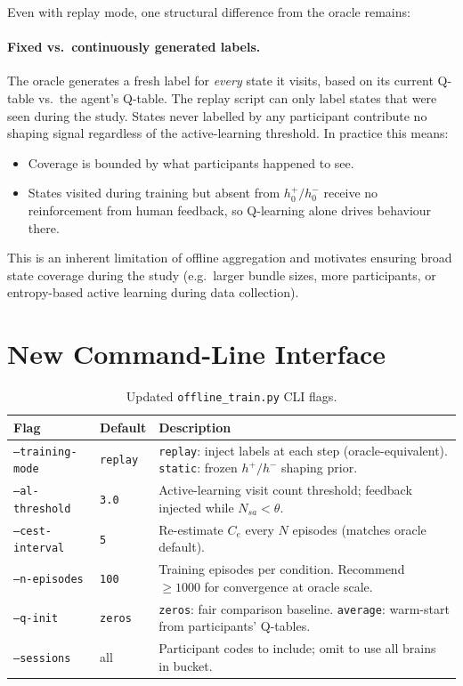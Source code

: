 \documentclass[11pt, a4paper]{article}
\begin{document}
Even with replay mode, one structural difference from the oracle remains:

\paragraph{Fixed vs.\ continuously generated labels.}
The oracle generates a fresh label for \emph{every} state it visits, based on
its current Q-table vs.\ the agent's Q-table.  The replay script can only
label states that were seen during the study.  States never labelled by any
participant contribute no shaping signal regardless of the active-learning
threshold.  In practice this means:
\begin{itemize}
  \item Coverage is bounded by what participants happened to see.
  \item States visited during training but absent from $h^+_0/h^-_0$ receive
        no reinforcement from human feedback, so Q-learning alone drives
        behaviour there.
\end{itemize}
This is an inherent limitation of offline aggregation and motivates ensuring
broad state coverage during the study (e.g.\ larger bundle sizes, more
participants, or entropy-based active learning during data collection).

\section{New Command-Line Interface}
\label{sec:cli}

\begin{table}[h!]
\centering
\begin{tabular}{llp{7.5cm}}
\toprule
Flag & Default & Description \\
\midrule
\texttt{--training-mode} & \texttt{replay}
  & \texttt{replay}: inject labels at each step (oracle-equivalent).
    \texttt{static}: frozen $h^+/h^-$ shaping prior. \\
\texttt{--al-threshold}  & \texttt{3.0}
  & Active-learning visit count threshold; feedback injected while
    $N_{sa} < \theta$. \\
\texttt{--cest-interval} & \texttt{5}
  & Re-estimate $C_e$ every $N$ episodes (matches oracle default). \\
\texttt{--n-episodes}    & \texttt{100}
  & Training episodes per condition.  Recommend $\geq 1000$ for
    convergence at oracle scale. \\
\texttt{--q-init}        & \texttt{zeros}
  & \texttt{zeros}: fair comparison baseline.
    \texttt{average}: warm-start from participants' Q-tables. \\
\texttt{--sessions}      & all
  & Participant codes to include; omit to use all brains in bucket. \\
\bottomrule
\end{tabular}
\caption{Updated \texttt{offline\_train.py} CLI flags.}
\end{table}
\end{document}
